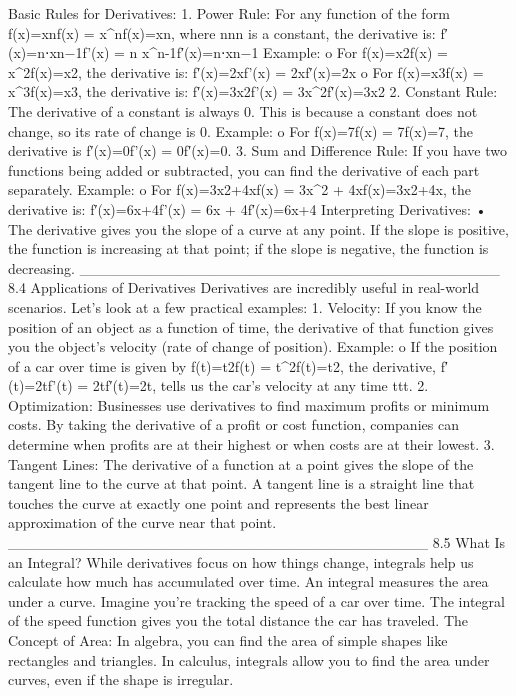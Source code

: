 Basic Rules for Derivatives:
1.	Power Rule: For any function of the form f(x)=xnf(x) = x^nf(x)=xn, where nnn is a constant, the derivative is:
f′(x)=n⋅xn−1f'(x) = n \cdot x^{n-1}f′(x)=n⋅xn−1
Example:
o	For f(x)=x2f(x) = x^2f(x)=x2, the derivative is: f′(x)=2xf'(x) = 2xf′(x)=2x
o	For f(x)=x3f(x) = x^3f(x)=x3, the derivative is: f′(x)=3x2f'(x) = 3x^2f′(x)=3x2
2.	Constant Rule: The derivative of a constant is always 0. This is because a constant does not change, so its rate of change is 0.
Example:
o	For f(x)=7f(x) = 7f(x)=7, the derivative is f′(x)=0f'(x) = 0f′(x)=0.
3.	Sum and Difference Rule: If you have two functions being added or subtracted, you can find the derivative of each part separately.
Example:
o	For f(x)=3x2+4xf(x) = 3x^2 + 4xf(x)=3x2+4x, the derivative is: f′(x)=6x+4f'(x) = 6x + 4f′(x)=6x+4
Interpreting Derivatives:
•	The derivative gives you the slope of a curve at any point. If the slope is positive, the function is increasing at that point; if the slope is negative, the function is decreasing.
________________________________________
8.4 Applications of Derivatives
Derivatives are incredibly useful in real-world scenarios. Let’s look at a few practical examples:
1.	Velocity: If you know the position of an object as a function of time, the derivative of that function gives you the object’s velocity (rate of change of position).
Example:
o	If the position of a car over time is given by f(t)=t2f(t) = t^2f(t)=t2, the derivative, f′(t)=2tf'(t) = 2tf′(t)=2t, tells us the car’s velocity at any time ttt.
2.	Optimization: Businesses use derivatives to find maximum profits or minimum costs. By taking the derivative of a profit or cost function, companies can determine when profits are at their highest or when costs are at their lowest.
3.	Tangent Lines: The derivative of a function at a point gives the slope of the tangent line to the curve at that point. A tangent line is a straight line that touches the curve at exactly one point and represents the best linear approximation of the curve near that point.
________________________________________
8.5 What Is an Integral?
While derivatives focus on how things change, integrals help us calculate how much has accumulated over time. An integral measures the area under a curve.
Imagine you’re tracking the speed of a car over time. The integral of the speed function gives you the total distance the car has traveled.
The Concept of Area:
In algebra, you can find the area of simple shapes like rectangles and triangles. In calculus, integrals allow you to find the area under curves, even if the shape is irregular.
